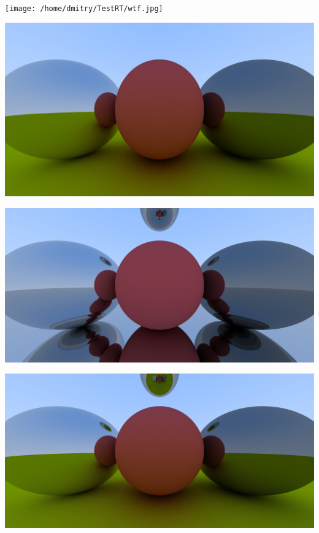 \documentclass{beamer}
\begin{document}
\begin{frame}
	\texttt{[image: /home/dmitry/TestRT/wtf.jpg]}
\end{frame}
\begin{frame}
	\includegraphics[width=\linewidth]{picture.jpg}
\end{frame}

\begin{frame}
	\includegraphics[width=\linewidth]{metal.jpg}
\end{frame}

\begin{frame}
	\includegraphics[width=\linewidth]{fiveSpheres.jpg}
\end{frame}
\end{document}

